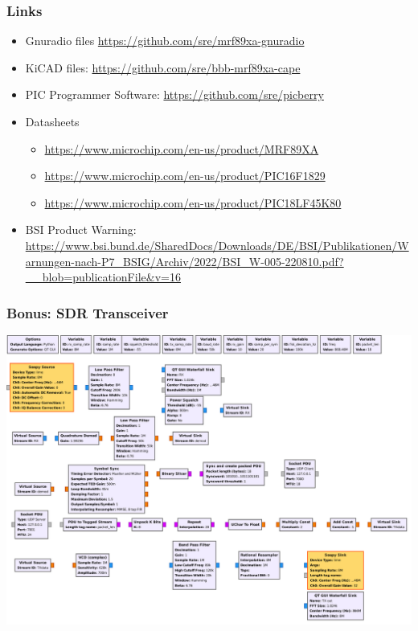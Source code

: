 \documentclass[aspectratio=169]{beamer}
\begin{document}
\begin{frame}
	\frametitle{Links}

	\begin{itemize}
		\item Gnuradio files \url{https://github.com/sre/mrf89xa-gnuradio}
		\item KiCAD files: \url{https://github.com/sre/bbb-mrf89xa-cape}
		\item PIC Programmer Software: \url{https://github.com/sre/picberry}
		\item Datasheets
			\begin{itemize}
				\item \url{https://www.microchip.com/en-us/product/MRF89XA}
				\item \url{https://www.microchip.com/en-us/product/PIC16F1829}
				\item \url{https://www.microchip.com/en-us/product/PIC18LF45K80}
			\end{itemize}
		\item BSI Product Warning: \url{https://www.bsi.bund.de/SharedDocs/Downloads/DE/BSI/Publikationen/Warnungen-nach-P7_BSIG/Archiv/2022/BSI_W-005-220810.pdf?__blob=publicationFile&v=16}
	\end{itemize}
\end{frame}


\begin{frame}
	\frametitle{Bonus: SDR Transceiver}

	\begin{center}
		\includegraphics[height=0.9\textheight]{full-gnuradio-pipeline-dark.pdf}
	\end{center}
\end{frame}
\end{document}
